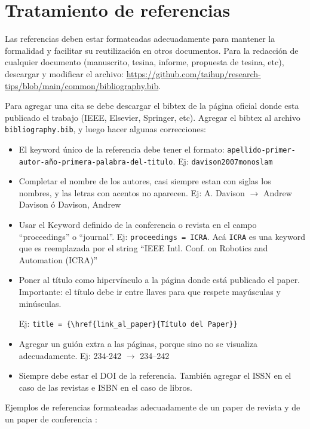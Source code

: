 \documentclass[a4paper,	11pt]{article}
\begin{document}
\section{Tratamiento de referencias}
Las referencias deben estar formateadas adecuadamente para mantener la formalidad y facilitar su reutilización en otros documentos. Para la redacción de cualquier documento (manuscrito, tesina, informe, propuesta de tesina, etc), descargar y modificar el archivo: \url{https://github.com/taihup/research-tips/blob/main/common/bibliography.bib}.

Para agregar una cita se debe descargar el bibtex de la página oficial donde esta publicado el trabajo (IEEE, Elsevier, Springer, etc). Agregar el bibtex al archivo \lstinline{bibliography.bib}, y luego hacer algunas correcciones:
\begin{itemize}
    \item El keyword único de la referencia debe tener el formato: \lstinline{apellido-primer-autor-año-primera-palabra-del-titulo}. Ej: \lstinline{davison2007monoslam}
    \item Completar el nombre de los autores, casi siempre estan con siglas los nombres, y las letras con acentos no aparecen. Ej: A. Davison $\rightarrow$ Andrew Davison ó Davison, Andrew
    \item Usar el Keyword definido de la conferencia o revista en el campo ``proceedings'' o ``journal''. Ej: \lstinline|proceedings = ICRA|. Acá \lstinline|ICRA| es una keyword que es reemplazada por el string ``IEEE Intl. Conf. on Robotics and Automation (ICRA)''
    \item Poner al título como hipervínculo a la página donde está publicado el paper. Importante: el título debe ir entre llaves para que respete mayúsculas y minúsculas.
    
    Ej: \lstinline|title = {\href{link_al_paper}{Título del Paper}}|
    \item Agregar un guión extra a las páginas, porque sino no se visualiza adecuadamente. Ej: 234-242 $\rightarrow$ 234--242
    \item Siempre debe estar el DOI de la referencia. También agregar el ISSN en el caso de las revistas e ISBN en el caso de libros.
\end{itemize}


Ejemplos de referencias formateadas adecuadamente de un paper de revista \cite{pire2019rosario} y de un paper de conferencia \cite{pire2015sptam}: 
\end{document}
